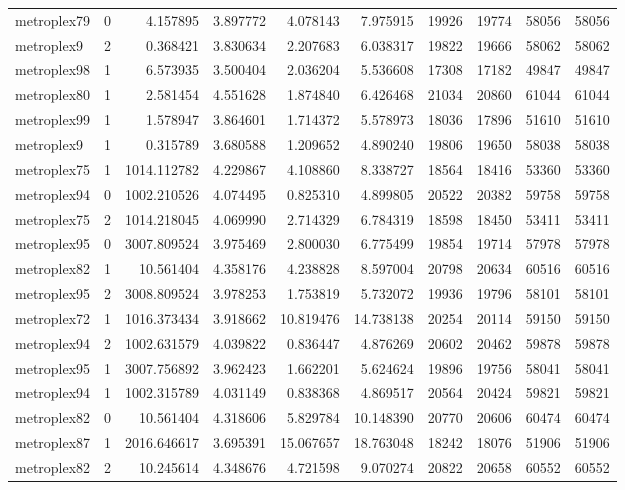 \begin{longtable}{|l|r|r|r|r|r|r|r|r|r|}
metroplex79 & 0 & 4.157895 & 3.897772 & 4.078143 & 7.975915 & 19926 & 19774 & 58056 & 58056 \\
metroplex9 & 2 & 0.368421 & 3.830634 & 2.207683 & 6.038317 & 19822 & 19666 & 58062 & 58062 \\
metroplex98 & 1 & 6.573935 & 3.500404 & 2.036204 & 5.536608 & 17308 & 17182 & 49847 & 49847 \\
metroplex80 & 1 & 2.581454 & 4.551628 & 1.874840 & 6.426468 & 21034 & 20860 & 61044 & 61044 \\
metroplex99 & 1 & 1.578947 & 3.864601 & 1.714372 & 5.578973 & 18036 & 17896 & 51610 & 51610 \\
metroplex9 & 1 & 0.315789 & 3.680588 & 1.209652 & 4.890240 & 19806 & 19650 & 58038 & 58038 \\
metroplex75 & 1 & 1014.112782 & 4.229867 & 4.108860 & 8.338727 & 18564 & 18416 & 53360 & 53360 \\
metroplex94 & 0 & 1002.210526 & 4.074495 & 0.825310 & 4.899805 & 20522 & 20382 & 59758 & 59758 \\
metroplex75 & 2 & 1014.218045 & 4.069990 & 2.714329 & 6.784319 & 18598 & 18450 & 53411 & 53411 \\
metroplex95 & 0 & 3007.809524 & 3.975469 & 2.800030 & 6.775499 & 19854 & 19714 & 57978 & 57978 \\
metroplex82 & 1 & 10.561404 & 4.358176 & 4.238828 & 8.597004 & 20798 & 20634 & 60516 & 60516 \\
metroplex95 & 2 & 3008.809524 & 3.978253 & 1.753819 & 5.732072 & 19936 & 19796 & 58101 & 58101 \\
metroplex72 & 1 & 1016.373434 & 3.918662 & 10.819476 & 14.738138 & 20254 & 20114 & 59150 & 59150 \\
metroplex94 & 2 & 1002.631579 & 4.039822 & 0.836447 & 4.876269 & 20602 & 20462 & 59878 & 59878 \\
metroplex95 & 1 & 3007.756892 & 3.962423 & 1.662201 & 5.624624 & 19896 & 19756 & 58041 & 58041 \\
metroplex94 & 1 & 1002.315789 & 4.031149 & 0.838368 & 4.869517 & 20564 & 20424 & 59821 & 59821 \\
metroplex82 & 0 & 10.561404 & 4.318606 & 5.829784 & 10.148390 & 20770 & 20606 & 60474 & 60474 \\
metroplex87 & 1 & 2016.646617 & 3.695391 & 15.067657 & 18.763048 & 18242 & 18076 & 51906 & 51906 \\
metroplex82 & 2 & 10.245614 & 4.348676 & 4.721598 & 9.070274 & 20822 & 20658 & 60552 & 60552 \\

\end{longtable}
